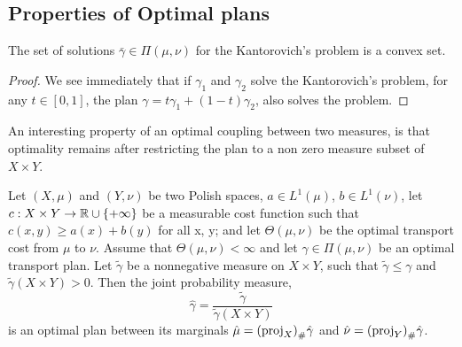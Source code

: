 \begin{theorem}
\subsection{Properties of Optimal plans}
\begin{theorem}
	The set of solutions $\bar\gamma\in\Pi(\mu,\nu)$ for the Kantorovich's problem is a convex set.
\end{theorem}
\begin{proof}
	We see immediately that if $\gamma_1$ and $\gamma_2$ solve the Kantorovich's problem, for any $t\in[0,1]$, the plan $\gamma=t\gamma_1+(1-t)\gamma_2$, also solves the problem. 
\end{proof}
\end{theorem}
An interesting property of an optimal coupling between two measures, is that optimality remains after restricting the plan to a non zero measure subset of $X\times Y$. 
\begin{theorem}
	Let $(X, \mu)$ and $(Y, \nu)$ be two Polish spaces, $a \in L^1(\mu)$, $b \in L^1(\nu)$, let $c : X \times Y \rightarrow
	\mathbb{R}\cup \left\lbrace +\infty \right\rbrace$ be a measurable cost function such that $c(x, y) \geq a(x) + b(y)$ for all x, y; and let $\Theta(\mu, \nu)$ be the optimal transport cost from $\mu$ to $\nu$.
	Assume that $\Theta(\mu, \nu)<\infty$  and let $\gamma \in \Pi(\mu,\nu)$ be an optimal transport plan. Let $\tilde\gamma$ be a nonnegative measure on $X\times Y$, such that $\tilde \gamma\leq \gamma$ and $\tilde \gamma(X\times Y)>0$. Then the joint probability measure,
	\begin{equation*}
	\hat\gamma = \frac{\tilde\gamma}{\tilde\gamma(X\times Y)}
	\end{equation*}
	is an optimal plan between its marginals $\hat\mu={(\mathrm{proj}_X)}_{\#} \hat \gamma$ and $\hat\nu ={(\mathrm{proj}_Y)}_{\#} \hat \gamma$. 	
\end{theorem}

